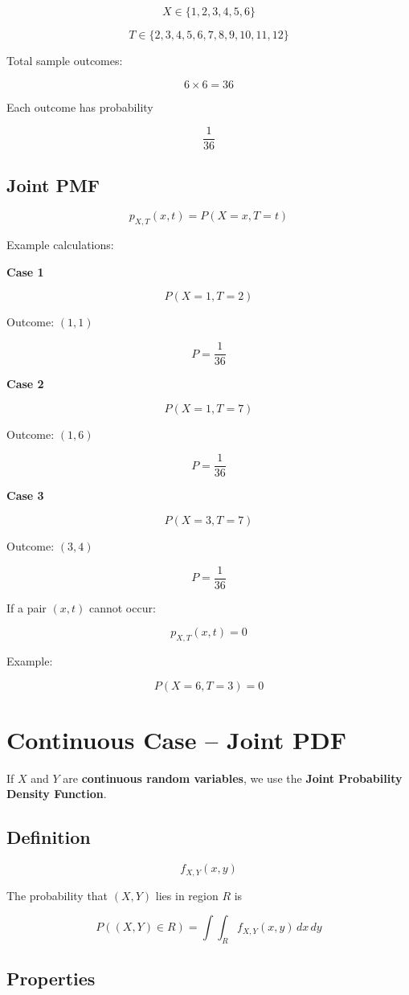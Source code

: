 \documentclass[12pt]{article}
\begin{document}
\[
X \in \{1,2,3,4,5,6\}
\]

\[
T \in \{2,3,4,5,6,7,8,9,10,11,12\}
\]

Total sample outcomes:

\[
6 \times 6 = 36
\]

Each outcome has probability

\[
\frac{1}{36}
\]

\subsection{Joint PMF}

\[
p_{X,T}(x,t)=P(X=x,T=t)
\]

Example calculations:

\textbf{Case 1}

\[
P(X=1,T=2)
\]

Outcome: $(1,1)$

\[
P=\frac{1}{36}
\]

\textbf{Case 2}

\[
P(X=1,T=7)
\]

Outcome: $(1,6)$

\[
P=\frac{1}{36}
\]

\textbf{Case 3}

\[
P(X=3,T=7)
\]

Outcome: $(3,4)$

\[
P=\frac{1}{36}
\]

If a pair $(x,t)$ cannot occur:

\[
p_{X,T}(x,t)=0
\]

Example:

\[
P(X=6,T=3)=0
\]

\section{Continuous Case -- Joint PDF}

If $X$ and $Y$ are \textbf{continuous random variables}, we use the \textbf{Joint Probability Density Function}.

\subsection{Definition}

\[
f_{X,Y}(x,y)
\]

The probability that $(X,Y)$ lies in region $R$ is

\[
P((X,Y)\in R)=\int\int_R f_{X,Y}(x,y)\,dx\,dy
\]

\subsection{Properties}
\end{document}
